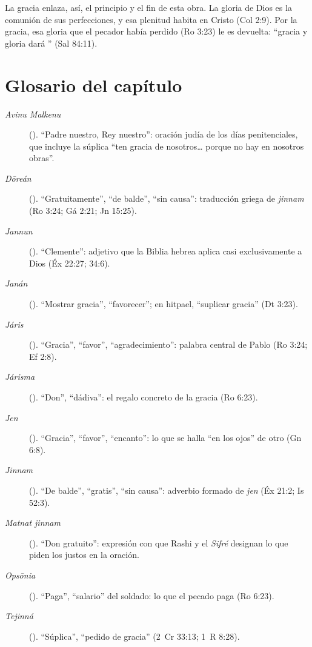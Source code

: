 La gracia enlaza, así, el principio y el fin de esta obra. La gloria de Dios es la comunión de sus perfecciones, y esa plenitud habita en Cristo (Col 2:9). Por la gracia, esa gloria que el pecador había perdido (Ro 3:23) le es devuelta: ``gracia y gloria dará \SENOR'' (Sal 84:11).

\section*{Glosario del capítulo}
\begin{description}
\item[\emph{Avinu Malkenu}] (). ``Padre nuestro, Rey nuestro'': oración judía de los días penitenciales, que incluye la súplica ``ten gracia de nosotros\ldots{} porque no hay en nosotros obras''.
\item[\emph{Dōreán}] (). ``Gratuitamente'', ``de balde'', ``sin causa'': traducción griega de \emph{jinnam} (Ro 3:24; Gá 2:21; Jn 15:25).
\item[\emph{Jannun}] (). ``Clemente'': adjetivo que la Biblia hebrea aplica casi exclusivamente a Dios (Éx 22:27; 34:6).
\item[\emph{Janán}] (). ``Mostrar gracia'', ``favorecer''; en hitpael, ``suplicar gracia'' (Dt 3:23).
\item[\emph{Járis}] (). ``Gracia'', ``favor'', ``agradecimiento'': palabra central de Pablo (Ro 3:24; Ef 2:8).
\item[\emph{Járisma}] (). ``Don'', ``dádiva'': el regalo concreto de la gracia (Ro 6:23).
\item[\emph{Jen}] (). ``Gracia'', ``favor'', ``encanto'': lo que se halla ``en los ojos'' de otro (Gn 6:8).
\item[\emph{Jinnam}] (). ``De balde'', ``gratis'', ``sin causa'': adverbio formado de \emph{jen} (Éx 21:2; Is 52:3).
\item[\emph{Matnat jinnam}] (). ``Don gratuito'': expresión con que Rashi y el \emph{Sifré} designan lo que piden los justos en la oración.
\item[\emph{Opsōnia}] (). ``Paga'', ``salario'' del soldado: lo que el pecado paga (Ro 6:23).
\item[\emph{Tejinná}] (). ``Súplica'', ``pedido de gracia'' (2~Cr 33:13; 1~R 8:28).
\end{description}

